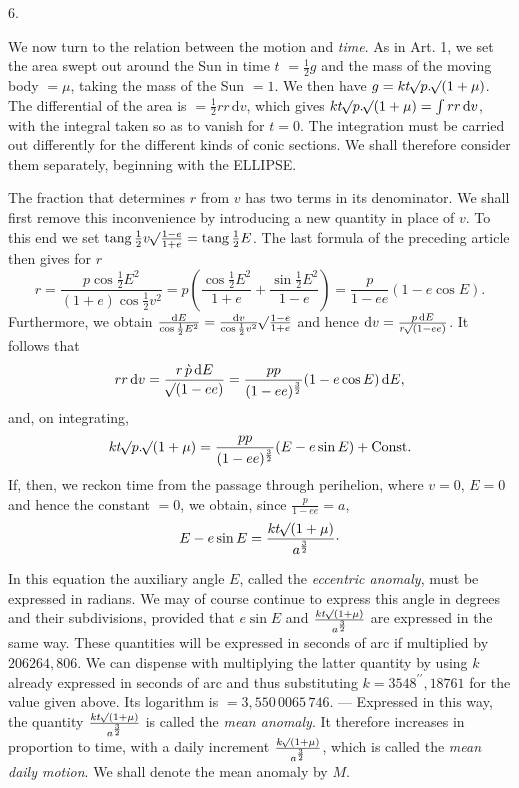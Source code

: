 \par{}
\begin{center}
6.
\end{center}
We now turn to the relation between the motion and \emph{time}. As in Art. 1, we set the area swept out around the Sun in time $t$ $= \frac{1}{2}g$ and the mass of the moving body $= \mu$, taking the mass of the Sun $= 1$. We then have $g = kt\mathord{{}^{}\!\surd}p.\mathord{{}^{}\!\surd}(1+\mu)$. The differential of the area is $= \frac{1}{2}rr\,\mathrm{d}v$, which gives $kt\mathord{{}^{}\!\surd}p.\mathord{{}^{}\!\surd}(1+\mu)
= \int rr\,\mathrm{d}v$, with the integral taken so as to vanish for $t=0$. The integration must be carried out differently for the different kinds of conic sections. We shall therefore consider them separately, beginning with the ELLIPSE.

The fraction that determines $r$ from $v$ has two terms in its denominator. We shall first remove this inconvenience by introducing a new quantity in place of $v$. To this end we set $\operatorname{tang}\frac{1}{2}v\mathord{{}^{}\!\surd}\frac{1-e}{1+e}
= \operatorname{tang}\frac{1}{2}E$. The last formula of the preceding article then gives for $r$
\[
r = \frac{p\cos\frac{1}{2}E^2}{(1+e)\cos\frac{1}{2}v^2} = p\left(\frac{\cos\frac{1}{2}E^2}{1+e}+\frac{\sin\frac{1}{2}E^2}{1-e}\right) = \frac{p}{1-ee}(1-e\cos E).
\]
Furthermore, we obtain $\frac{\mathrm{d}E}{\cos\frac{1}{2}E^2} = \frac{\mathrm{d}v}{\cos\frac{1}{2}v^2}\mathord{{}^{}\!\surd}\frac{1-e}{1+e}$ and hence $\mathrm{d}v = \frac{p\,\mathrm{d}E}{r\mathord{{}^{}\!\surd}(1-ee)}$. It follows that
\[
rr\,\mathrm{d}v = \frac{r\,\grave{p}\,\mathrm{d}E}{\mathord{{}^{}\!\surd}(1-ee)} = \frac{pp}{(1-ee)^{\frac{3}{2}}}(1-e\cos E)\,\mathrm{d}E,
\]
and, on integrating,
\[
kt\mathord{{}^{}\!\surd}p.\mathord{{}^{}\!\surd}(1+\mu) = \frac{pp}{(1-ee)^{\frac{3}{2}}}(E-e\sin E)+\mathrm{Const.}
\]
If, then, we reckon time from the passage through perihelion, where $v=0$, $E=0$
and hence the constant $= 0$, we obtain, since $\frac{p}{1-ee}=a$,
\[
E-e\sin E = \frac{kt\mathord{{}^{}\!\surd}(1+\mu)}{a^{\frac{3}{2}}}\cdot
\]

In this equation the auxiliary angle $E$, called the \emph{eccentric anomaly}, must be expressed in radians. We may of course continue to express this angle in degrees and their subdivisions, provided that $e\sin E$ and $\frac{kt\mathord{{}^{}\!\surd}(1+\mu)}{a^{\frac{3}{2}}}$ are expressed in the same way. These quantities will be expressed in seconds of arc if multiplied by $206264{,}806$. We can dispense with multiplying the latter quantity by using $k$ already expressed in seconds of arc and thus substituting $k = 3548^{\prime\prime}{,}18761$ for the value given above. Its logarithm is $= 3{,}550\,0065\,746$. — Expressed in this way, the quantity $\frac{kt\mathord{{}^{}\!\surd}(1+\mu)}{a^{\frac{3}{2}}}$ is called the \emph{mean anomaly}. It therefore increases in proportion to time, with a daily increment $\frac{k\mathord{{}^{}\!\surd}(1+\mu)}{a^{\frac{3}{2}}}$, which is called the \emph{mean daily motion}. We shall denote the mean anomaly by $M$.
